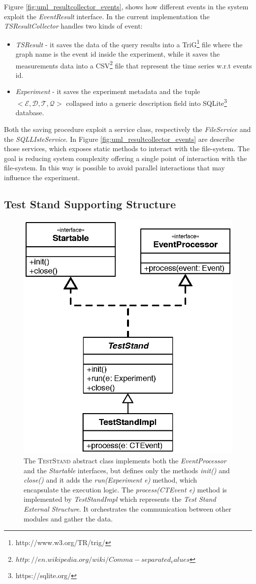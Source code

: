 Figure \ref{fig:uml_resultcollector_events}, shows how different events in the system exploit the \textit{EventResult} interface. In the current implementation the \textit{TSResultCollector} handles two kinds of event:
\begin{itemize}
\item \textit{TSResult} - it saves the data of the query results into a TriG\footnote{http://www.w3.org/TR/trig/} file where the graph name is the event id inside the experiment, while it saves the measurements data into a CSV\footnote{$http://en.wikipedia.org/wiki/Comma-separated_values$} file that represent the time series w.r.t events id. 
\item \textit{Experiment} - it saves the experiment metadata and the tuple \\ $<\mathcal{E},\mathcal{D},\mathcal{T},\mathcal{Q}>$ collapsed into a generic description field into SQLite\footnote{https://sqlite.org/} database.
\end{itemize} 

Both the saving procedure exploit a service class, respectively the \textit{FileService} and the \textit{SQLLIsteService}. In Figure \ref{fig:uml_resultcollector_events} are describe those services, which exposes static methods to interact with the file-system. The goal is reducing system complexity offering a single point of interaction with the file-system. In this way is possible  to avoid parallel interactions that may influence the experiment. 


\subsection{Test Stand Supporting Structure}\label{sec:teststand-impl}


\begin{figure}[tbh]
  \centering
	\includegraphics[width=0.5\linewidth]{images/uml_teststand}
	\caption[\name \textsc{TestStand} - UML Schema]{The \textsc{TestStand} abstract class implements both the \textit{EventProcessor} and the \textit{Startable} interfaces, but defines only the methods \textit{init()} and \textit{close()}  and it adds the \textit{run(Experiment e)} method, which encapsulate the execution logic. The \textit{process(CTEvent e)} method is implemented by \textit{TestStandImpl} which represents the \textit{Test Stand External Structure}. It orchestrates the communication between other modules and gather the data.}
  	\label{fig:uml_teststand}
\end{figure}


